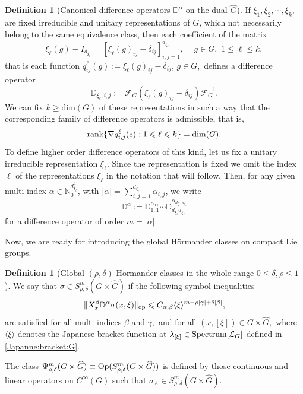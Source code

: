 \documentclass[12pt, reqno]{amsart}
\theoremstyle{definition}
\newtheorem{definition}[theorem]{Definition}
\theoremstyle{remark}
\numberwithin{equation}{section}
\begin{document}
\begin{definition}[Canonical difference operators $\mathbb{D}^\alpha$ on the dual $\widehat{G}$] If $\xi_{1},\xi_2,\cdots, \xi_{k},$ are  fixed irreducible and unitary  representations of $G$, which not necessarily belong to the same equivalence class, then each coefficient of the matrix
\begin{equation}
 \xi_{\ell}(g)-I_{d_{\xi_{\ell}}}=[\xi_{\ell}(g)_{ij}-\delta_{ij}]_{i,j=1}^{d_{\xi_\ell}},\, \quad g\in G, \,\,1\leq \ell\leq k,
\end{equation} 
that is each function 
$q^{\ell}_{ij}(g):=\xi_{\ell}(g)_{ij}-\delta_{ij}$, $ g\in G,$ defines a difference operator
\begin{equation}\label{Difference:op:rep}
    \mathbb{D}_{\xi_\ell,i,j}:=\mathscr{F}_G(\xi_{\ell}(g)_{ij}-\delta_{ij})\mathscr{F}^{-1}_G.
\end{equation}
We can fix $k\geq \mathrm{dim}(G)$ of these representations in such a way that the corresponding  family of difference operators is admissible, that is, 
\begin{equation*}
    \textnormal{rank}\{\nabla q^{\ell}_{i,j}(e):1\leqslant \ell\leqslant k \}=\textnormal{dim}(G).
\end{equation*}
To define higher order difference operators of this kind, let us fix a unitary irreducible representation $\xi_\ell$.
Since the representation is fixed we omit the index $\ell$ of the representations $\xi_\ell$ in the notation that will follow.
Then, for any given multi-index $\alpha\in \mathbb{N}_0^{d_{\xi_\ell}^2}$, with 
$|\alpha|=\sum_{i,j=1}^{d_{\xi_\ell}}\alpha_{i,j}$, we write
$$\mathbb{D}^{\alpha}:=\mathbb{D}_{1,1}^{\alpha_{11}}\cdots \mathbb{D}^{\alpha_{d_{\xi_\ell},d_{\xi_\ell}}}_{d_{\xi_\ell}d_{\xi_\ell}}
$$ 
for a difference operator of order $m=|\alpha|$.    
\end{definition}
Now, we are rea\textnormal{d}y for introducing the global H\"ormander classes on compact Lie groups.
\begin{definition}[Global $(\rho,\delta)$-H\"ormander classes in the whole range $0\leq \delta,\rho\leq 1$]
    We say that $\sigma \in {S}^{m}_{\rho,\delta}(G\times \widehat{G})$ if the following symbol inequalities 
\begin{equation}\label{HormanderSymbolMatrix}
   \Vert {X}^\beta_x \mathbb{D}^{\alpha} \sigma(x,\xi)\Vert_{\textnormal{op}}\leqslant C_{\alpha,\beta}
    \langle \xi \rangle^{m-\rho|\gamma|+\delta|\beta|},
\end{equation} are satisfied for all multi-indices $\beta$ and  $\gamma ,$  and for all $(x,[\xi])\in G\times \widehat{G},$ where $ \langle \xi \rangle$ denotes the Japanese bracket function at $\lambda_{[\xi]}\in \textnormal{Spectrum}[\mathcal{L}_G]
$ defined in \ref{Japanne:bracket:G}.
\end{definition}
The class $\Psi^m_{\rho,\delta}(G\times \widehat{G})\equiv\textnormal{Op}({S}^m_{\rho,\delta}(G\times \widehat{G}))$ is defined by those continuous and linear operators on $C^\infty(G)$ such that $\sigma_A\in {S}^m_{\rho,\delta}(G\times \widehat{G}).$ 
\end{document}
